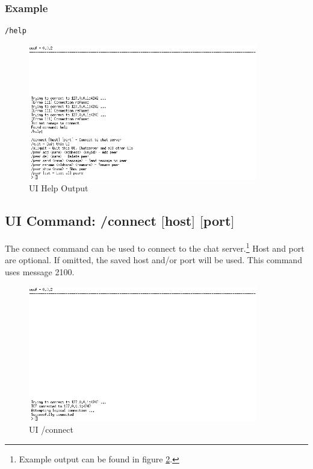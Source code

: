 \subsubsection{Example}
\begin{verbatim}
/help
\end{verbatim}
\begin{figure}
    \caption{UI Help Output}
    \label{help}
    \centering
    \includegraphics[width=10cm]{help-command.png}
\end{figure}

\subsection{UI Command: /connect $[$host$]$ $[$port$]$}
The connect command can be used to connect to the chat
server.\footnote{Example output can be found in figure \ref{connect}.}
Host and port are optional. If omitted, the saved host and/or
port will be used. This command uses message 2100.
\begin{figure}
    \caption{UI /connect}
    \label{connect}
    \centering
    \includegraphics[width=10cm]{connected-to-cs.png}
\end{figure}

